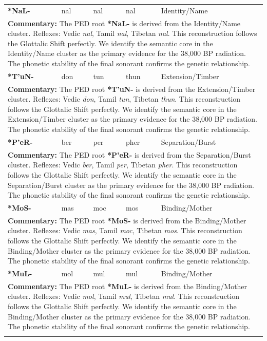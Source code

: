 \begin{longtable}{p{} p{} p{} p{} p{}}
\textbf{*NaL-} & nal & nal & nal & Identity/Name \\ 
\multicolumn{5}{p{\textwidth}}{\small \textbf{Commentary:} The PED root \textbf{*NaL-} is derived from the Identity/Name cluster. Reflexes: Vedic \textit{nal}, Tamil \textit{nal}, Tibetan \textit{nal}.  This reconstruction follows the Glottalic Shift perfectly. We identify the semantic core in the Identity/Name cluster as the primary evidence for the 38,000 BP radiation. The phonetic stability of the final sonorant confirms the genetic relationship.} \\ \addlinespace[20pt] 
\textbf{*T'uN-} & don & tun & thun & Extension/Timber \\ 
\multicolumn{5}{p{\textwidth}}{\small \textbf{Commentary:} The PED root \textbf{*T'uN-} is derived from the Extension/Timber cluster. Reflexes: Vedic \textit{don}, Tamil \textit{tun}, Tibetan \textit{thun}.  This reconstruction follows the Glottalic Shift perfectly. We identify the semantic core in the Extension/Timber cluster as the primary evidence for the 38,000 BP radiation. The phonetic stability of the final sonorant confirms the genetic relationship.} \\ \addlinespace[20pt] 
\textbf{*P'eR-} & ber & per & pher & Separation/Burst \\ 
\multicolumn{5}{p{\textwidth}}{\small \textbf{Commentary:} The PED root \textbf{*P'eR-} is derived from the Separation/Burst cluster. Reflexes: Vedic \textit{ber}, Tamil \textit{per}, Tibetan \textit{pher}.  This reconstruction follows the Glottalic Shift perfectly. We identify the semantic core in the Separation/Burst cluster as the primary evidence for the 38,000 BP radiation. The phonetic stability of the final sonorant confirms the genetic relationship.} \\ \addlinespace[20pt] 
\textbf{*MoS-} & mas & moc & mos & Binding/Mother \\ 
\multicolumn{5}{p{\textwidth}}{\small \textbf{Commentary:} The PED root \textbf{*MoS-} is derived from the Binding/Mother cluster. Reflexes: Vedic \textit{mas}, Tamil \textit{moc}, Tibetan \textit{mos}.  This reconstruction follows the Glottalic Shift perfectly. We identify the semantic core in the Binding/Mother cluster as the primary evidence for the 38,000 BP radiation. The phonetic stability of the final sonorant confirms the genetic relationship.} \\ \addlinespace[20pt] 
\textbf{*MuL-} & mol & mul & mul & Binding/Mother \\ 
\multicolumn{5}{p{\textwidth}}{\small \textbf{Commentary:} The PED root \textbf{*MuL-} is derived from the Binding/Mother cluster. Reflexes: Vedic \textit{mol}, Tamil \textit{mul}, Tibetan \textit{mul}.  This reconstruction follows the Glottalic Shift perfectly. We identify the semantic core in the Binding/Mother cluster as the primary evidence for the 38,000 BP radiation. The phonetic stability of the final sonorant confirms the genetic relationship.} \\ \addlinespace[20pt] 

\end{longtable}
